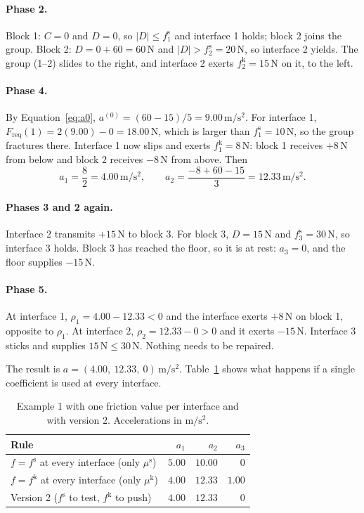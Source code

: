 \documentclass[11pt,a4paper]{article}
\newcommand{\fs}{f^{\mathrm{s}}}
\newcommand{\fkin}{f^{\mathrm{k}}}
\newcommand{\mus}{\mu^{\mathrm{s}}}
\newcommand{\muk}{\mu^{\mathrm{k}}}
\newcommand{\Freq}{F_{\mathrm{req}}}
\begin{document}
\paragraph{Phase 2.} Block 1: $C=0$ and $D=0$, so $|D|\le \fs_1$ and interface 1 holds; block 2 joins the group. Block 2: $D=0+60=60\,\mathrm{N}$ and $|D|>\fs_2=20\,\mathrm{N}$, so interface 2 yields. The group (1--2) slides to the right, and interface 2 exerts $\fkin_2=15\,\mathrm{N}$ on it, to the left.

\paragraph{Phase 4.} By Equation~\eqref{eq:a0}, $a^{(0)}=(60-15)/5=9.00\,\mathrm{m/s^2}$. For interface 1, $\Freq(1)=2(9.00)-0=18.00\,\mathrm{N}$, which is larger than $\fs_1=10\,\mathrm{N}$, so the group fractures there. Interface 1 now slips and exerts $\fkin_1=8\,\mathrm{N}$: block 1 receives $+8\,\mathrm{N}$ from below and block 2 receives $-8\,\mathrm{N}$ from above. Then
\[
a_1=\frac{8}{2}=4.00\,\mathrm{m/s^2},\qquad a_2=\frac{-8+60-15}{3}=12.33\,\mathrm{m/s^2}.
\]

\paragraph{Phases 3 and 2 again.} Interface 2 transmits $+15\,\mathrm{N}$ to block 3. For block 3, $D=15\,\mathrm{N}$ and $\fs_3=30\,\mathrm{N}$, so interface 3 holds. Block 3 has reached the floor, so it is at rest: $a_3=0$, and the floor supplies $-15\,\mathrm{N}$.

\paragraph{Phase 5.} At interface 1, $\rho_1=4.00-12.33<0$ and the interface exerts $+8\,\mathrm{N}$ on block 1, opposite to $\rho_1$. At interface 2, $\rho_2=12.33-0>0$ and it exerts $-15\,\mathrm{N}$. Interface 3 sticks and supplies $15\,\mathrm{N}\le30\,\mathrm{N}$. Nothing needs to be repaired.

The result is $a=(4.00,\ 12.33,\ 0)\,\mathrm{m/s^2}$. Table~\ref{tab:ex1} shows what happens if a single coefficient is used at every interface.

\begin{table}[ht]
\centering\small
\caption{Example 1 with one friction value per interface and with version 2. Accelerations in $\mathrm{m/s^2}$.}\label{tab:ex1}
\begin{tabular}{@{}lrrr@{}}
\toprule
Rule & $a_1$ & $a_2$ & $a_3$\\
\midrule
$f=\fs$ at every interface (only $\mus$) & $5.00$ & $10.00$ & $0$\\
$f=\fkin$ at every interface (only $\muk$) & $4.00$ & $12.33$ & $1.00$\\
Version 2 ($\fs$ to test, $\fkin$ to push) & $4.00$ & $12.33$ & $0$\\
\bottomrule
\end{tabular}
\end{table}
\end{document}
